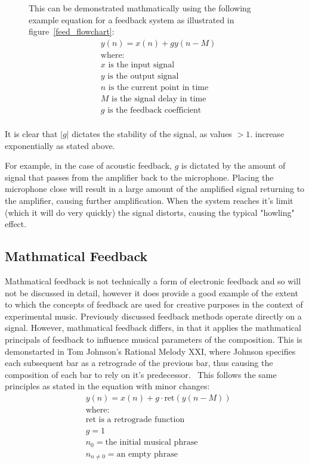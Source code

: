 \documentclass[titlepage]{scrartcl}
\begin{document}
    \begin{figure}[H]
    This can be demonstrated mathmatically using the following example equation
    for a feedback system as illustrated in figure~\ref{feed_flowchart}:
        \begin{align*}
            & y(n) = x(n) + gy(n-M)\\
            & \text{where:}\\
            & x\text{ is the input signal}\\
            & y\text{ is the output signal}\\
            & n\text{ is the current point in time}\\
            & M\text{ is the signal delay in time}\\
            & g\text{ is the feedback coefficient}\\
        \end{align*}
    \end{figure}
    It is clear that $|g|$ dictates the stability of the signal, as values
    $>1.$ increase exponentially as stated above.~\parencite[p.70-72]{zolzer2011dafx} 

    For example, in the case of acoustic feedback, $g$ is dictated by the
    amount of signal that passes from the amplifier back to the microphone.
    Placing the microphone close will result in a large amount of the amplified
    signal returning to the amplifier, causing further amplification. When the
    system reaches it's limit (which it will do very quickly) the signal
    distorts, causing the typical "howling" effect.

    \subsection{Mathmatical Feedback}
    Mathmatical feedback is not technically a form of electronic feedback and
    so will not be discussed in detail, however it does provide a good example
    of the extent to which the concepts of feedback are used for creative
    purposes in the context of experimental music. 
    Previously discussed feedback methods operate directly on a signal.
    However, mathmatical feedback differs, in that it applies the mathmatical
    principals of feedback to influence musical parameters of the composition.
    This is demonstarted in Tom Johnson's Rational Melody XXI, where Johnson
    specifies each subsequent bar as a retrograde of the previous bar, thus
    causing the composition of each bar to rely on it's
    predecessor.~\parencite[p.72]{weisert2010ioi} This follows the same
    principles as stated in the equation with minor changes:
    \begin{align*}
        & y(n) = x(n) + g \cdot \text{ret}(y(n-M))\\
        & \text{where:}\\
        & \text{ret is a retrograde function}\\
        & g = 1\\
        & n_0 = \text{the initial musical phrase}\\
        & n_{n\neq0} = \text{an empty phrase}
    \end{align*}
    
\end{document}
